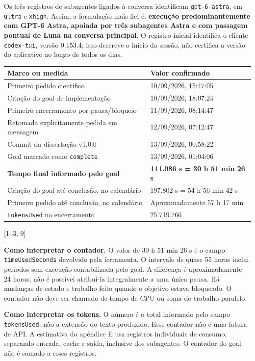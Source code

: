 \documentclass[11pt,a4paper]{article}
\newcommand{\fonte}[1]{{\small\color{navy}[#1]}}
\begin{document}
Os três registros de subagentes ligados à conversa identificam \nolinkurl{gpt-6-astra}, em \nolinkurl{ultra} e \nolinkurl{xhigh}. Assim, a formulação mais fiel é: \textbf{execução predominantemente com GPT-6 Astra, apoiada por três subagentes Astra e com passagem pontual de Luna na conversa principal}. O registro inicial identifica o cliente \nolinkurl{codex-tui}, versão 0.153.4; isso descreve o início da sessão, não certifica a versão do aplicativo ao longo de todos os dias.

\begin{tabularx}{\textwidth}{@{}Y p{6.1cm}@{}}
\toprule
\textbf{Marco ou medida} & \textbf{Valor confirmado}\\
\midrule
Primeiro pedido científico & 10/09/2026, 15:47:05\\
Criação do goal de implementação & 10/09/2026, 18:07:24\\
Primeiro encerramento por pausa/bloqueio & 11/09/2026, 08:14:47\\
Retomada explicitamente pedida em mensagem & 12/09/2026, 07:12:47\\
Commit da dissertação v1.0.0 & 13/09/2026, 00:58:22\\
Goal marcado como \nolinkurl{complete} & 13/09/2026, 01:04:06\\
\textbf{Tempo final informado pelo goal} & \textbf{111.086 s = 30 h 51 min 26 s}\\
Criação do goal até conclusão, no calendário & 197.802 s = 54 h 56 min 42 s\\
Primeiro pedido até conclusão, no calendário & Aproximadamente 57 h 17 min\\
\nolinkurl{tokensUsed} no encerramento & 25.719.766\\
\bottomrule
\end{tabularx}
\fonte{1--3, 9}

\textbf{Como interpretar o contador.} O valor de 30 h 51 min 26 s é o campo \nolinkurl{timeUsedSeconds} devolvido pela ferramenta. O intervalo de quase 55 horas inclui períodos sem execução contabilizada pelo goal. A diferença é aproximadamente 24 horas; não é possível atribuí-la integralmente a uma única pausa. Há mudanças de estado e trabalho feito quando o objetivo estava bloqueado. O contador não deve ser chamado de tempo de CPU ou soma do trabalho paralelo.

\textbf{Como interpretar os tokens.} O número é o total informado pelo campo \nolinkurl{tokensUsed}, não a extensão do texto produzido. Esse contador não é uma fatura de API. A estimativa do apêndice E usa registros individuais de consumo, separando entrada, cache e saída, inclusive dos subagentes. O contador do goal não é somado a esses registros.
\end{document}
